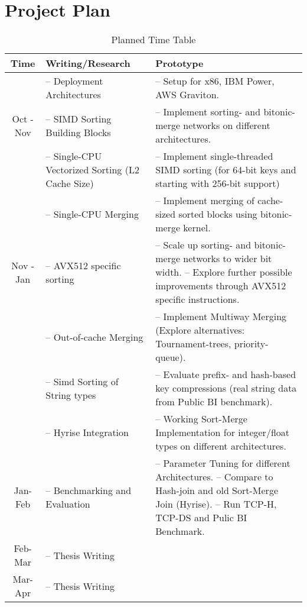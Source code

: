 \section{Project Plan}
\label{sec:plan}


\begin{table}[h!]
    \centering
    \begin{tabular}{ | c | m{} | m{} | }
        \hline
        \textbf{Time} & \textbf{Writing/Research} & \textbf{Prototype} \\
        \hline
                      & -- Deployment Architectures &  -- Setup for x86, IBM Power, AWS Graviton. \\
        Oct - Nov  & -- SIMD Sorting Building Blocks & -- Implement sorting- and bitonic-merge networks on different architectures.\\ 
                   & -- Single-CPU Vectorized Sorting (L2 Cache Size) & -- Implement single-threaded SIMD sorting (for 64-bit keys and starting with 256-bit support) \\ 
                   & -- Single-CPU Merging & -- Implement merging of cache-sized sorted blocks using bitonic-merge kernel. \\
        \hline
        Nov - Jan & -- AVX512 specific sorting & -- Scale up sorting- and bitonic-merge networks to wider bit width. \newline -- Explore further possible improvements through AVX512 specific instructions. \\
                  & -- Out-of-cache Merging & -- Implement Multiway Merging (Explore alternatives: Tournament-trees, priority-queue). \\    
                  & -- Simd Sorting of String types & -- Evaluate prefix- and hash-based key compressions (real string data from Public BI benchmark).\\ 
                  & -- Hyrise Integration & -- Working Sort-Merge Implementation for integer/float types on different architectures.\\ 
        \hline
        Jan-Feb & -- Benchmarking and Evaluation & -- Parameter Tuning for different Architectures. \newline 
                                                   -- Compare to Hash-join and old Sort-Merge Join (Hyrise). \newline
                                                   -- Run TCP-H, TCP-DS and Pulic BI Benchmark. \\
        \hline
        Feb-Mar & -- Thesis Writing & \\
        \hline
        Mar-Apr & -- Thesis Writing & \\
       \hline 
    \end{tabular}
    \caption{Planned Time Table}
    \label{tab:time-table}
\end{table}
